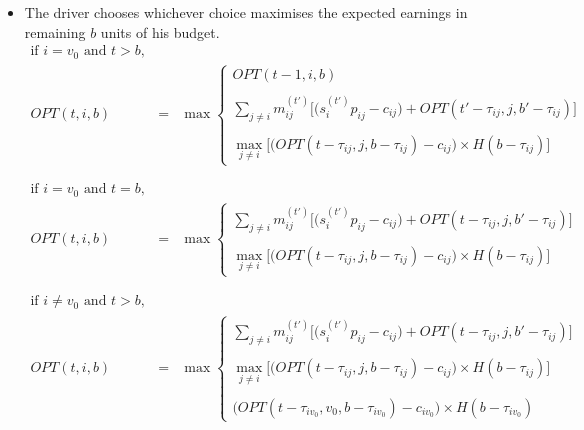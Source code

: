 \begin{itemize}
\item The driver chooses whichever choice maximises the expected earnings in remaining $b$ units of his budget. \\
        \begin{eqnarray*}
        \text{if }i=v_0 \text{ and } t>b, \\ 
        OPT(t, i, b) &=& \max
        \begin{cases}
        OPT(t-1, i, b)\\ \\
        \sum\limits_{j\neq i}m_{ij}^{(t')}\bigg[\Big(s_{i}^{(t')} p_{ij} - c_{ij}\Big) + OPT(t'-\tau_{ij},j, b'-\tau_{ij})\bigg] \\ \\
        \max\limits_{j\neq i}\Big[\Big(OPT(t-\tau_{ij},j, b - \tau_{ij}) - c_{ij}\Big)\times H(b - \tau_{ij})\Big]
        \end{cases} \\ \\ \\
        \text{if }i=v_0 \text{ and } t=b, \\ 
        OPT(t, i, b) &=& \max
        \begin{cases}
        \sum\limits_{j\neq i}m_{ij}^{(t')}\bigg[\Big(s_{i}^{(t')} p_{ij} - c_{ij}\Big) + OPT(t-\tau_{ij},j, b'-\tau_{ij})\bigg] \\ \\
        \max\limits_{j\neq i}\Big[\Big(OPT(t-\tau_{ij},j, b - \tau_{ij}) - c_{ij}\Big)\times H(b - \tau_{ij})\Big]
        \end{cases} \\ \\ \\
        \text{if }i\neq v_0 \text{ and } t>b, \\ 
        OPT(t, i, b) &=& \max
        \begin{cases}
        \sum\limits_{j\neq i}m_{ij}^{(t')}\bigg[\Big(s_{i}^{(t')} p_{ij} - c_{ij}\Big) + OPT(t-\tau_{ij},j, b'-\tau_{ij})\bigg] \\ \\
        \max\limits_{j\neq i}\Big[\Big(OPT(t-\tau_{ij},j, b - \tau_{ij}) - c_{ij}\Big)\times H(b - \tau_{ij})\Big] \\ \\
        \Big(OPT(t-\tau_{iv_0}, v_0, b - \tau_{iv_0}) - c_{iv_0}\Big) \times H(b - \tau_{iv_0})
        \end{cases} \\ \\ \\

\end{eqnarray*}
\end{itemize}
